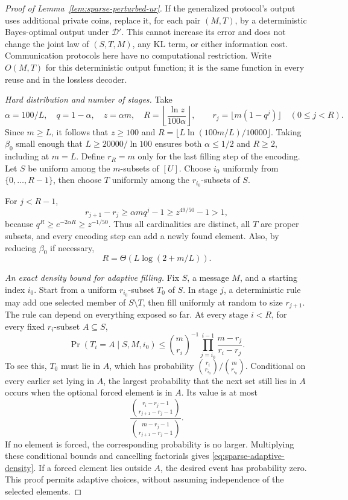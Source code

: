 \documentclass[11pt,letterpaper]{article}
\numberwithin{equation}{section}
\begin{document}
\begin{proof}[Proof of Lemma~\ref{lem:sparse-perturbed-ur}]
If the generalized protocol's output uses additional private coins, replace it, for each pair $(M,T)$, by a deterministic Bayes-optimal output under $\mathcal D'$.
This cannot increase its error and does not change the joint law of $(S,T,M)$, any KL term, or either information cost.
Communication protocols here have no computational restriction.
Write $O(M,T)$ for this deterministic output function; it is the same function in every reuse and in the lossless decoder.

\emph{Hard distribution and number of stages.} Take
\[
 \alpha=100/L,\quad q=1-\alpha,\quad z=\alpha m,\quad
 R=\left\lfloor\frac{\ln z}{100\alpha}\right\rfloor,
 \qquad r_j=\lfloor m(1-q^j)\rfloor\quad(0\le j<R).
\]
Since $m\ge L$, it follows that $z\ge100$ and $R=\lfloor L\ln(100m/L)/10000\rfloor$.
Taking $\beta_0$ small enough that $L\ge20000/\ln100$ ensures both $\alpha\le1/2$ and $R\ge2$, including at $m=L$.
Define $r_R=m$ only for the last filling step of the encoding.
Let $S$ be uniform among the $m$-subsets of $[U]$.
Choose $i_0$ uniformly from $\{0,\ldots,R-1\}$, then choose $T$ uniformly among the $r_{i_0}$-subsets of $S$.

For $j<R-1$,
\[
 r_{j+1}-r_j\ge\alpha m q^j-1
 \ge z^{49/50}-1>1,
\]
because $q^R\ge e^{-2\alpha R}\ge z^{-1/50}$.
Thus all cardinalities are distinct, all $T$ are proper subsets, and every encoding step can add a newly found element.
Also, by reducing $\beta_0$ if necessary,
\begin{equation}
 R=\Theta\!\left(L\log(2+m/L)\right).
 \label{eq:sparse-stages}
\end{equation}

\emph{An exact density bound for adaptive filling.} Fix $S$, a message $M$, and a starting index $i_0$.
Start from a uniform $r_{i_0}$-subset $T_0$ of $S$.
In stage $j$, a deterministic rule may add one selected member of $S\setminus T$, then fill uniformly at random to size $r_{j+1}$.
The rule can depend on everything exposed so far.
At every stage $i<R$, for every fixed $r_i$-subset $A\subseteq S$,
\begin{equation}
 \Pr(T_i=A\mid S,M,i_0)
 \le\binom{m}{r_i}^{-1}
       \prod_{j=i_0}^{i-1}\frac{m-r_j}{r_i-r_j}.
 \label{eq:sparse-adaptive-density}
\end{equation}
To see this, $T_0$ must lie in $A$, which has probability $\binom{r_i}{r_{i_0}}/\binom{m}{r_{i_0}}$.
Conditional on every earlier set lying in $A$, the largest probability that the next set still lies in $A$ occurs when the optional forced element is in $A$.
Its value is at most
\[
 \frac{\binom{r_i-r_j-1}{r_{j+1}-r_j-1}}
      {\binom{m-r_j-1}{r_{j+1}-r_j-1}}.
\]
If no element is forced, the corresponding probability is no larger.
Multiplying these conditional bounds and cancelling factorials gives \eqref{eq:sparse-adaptive-density}.
If a forced element lies outside $A$, the desired event has probability zero.
This proof permits adaptive choices, without assuming independence of the selected elements.


\end{proof}
\end{document}
